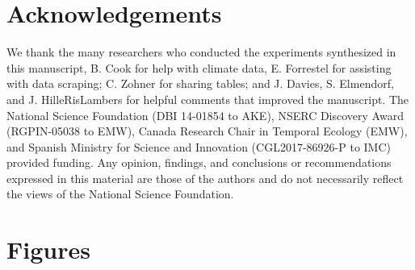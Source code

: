 \documentclass{article}
\begin{document}



\section*{Acknowledgements}
We thank the many researchers who conducted the experiments synthesized in this manuscript, B. Cook for help with climate data, E. Forrestel for assisting with data scraping; C. Zohner for sharing tables; and J. Davies, S. Elmendorf, and J. HilleRisLambers for helpful comments that improved the manuscript. The National Science Foundation (DBI 14-01854 to AKE), NSERC Discovery Award (RGPIN-05038 to EMW), Canada Research Chair in Temporal Ecology (EMW), and Spanish Ministry for Science and Innovation (CGL2017-86926-P to IMC) provided funding. Any opinion, findings, and conclusions or recommendations expressed in this material are those of the authors and do not necessarily reflect the views of the National Science Foundation.

\section* {Figures}
\end{document}
